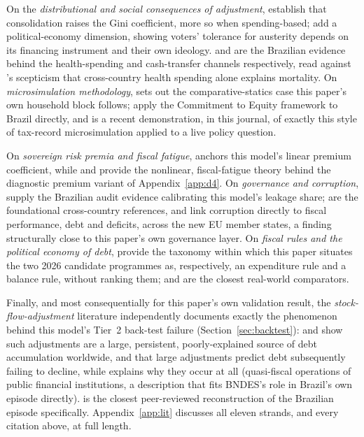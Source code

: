 \documentclass[11pt,a4paper]{article}
\begin{document}
On the \emph{distributional and social consequences of adjustment}, \citet{ballfurcerilleighlloungani2013,woobovakindazhang2017} establish that consolidation raises the Gini coefficient, more so when spending-based; \citet{lagopenasetal2024} add a political-economy dimension, showing voters' tolerance for austerity depends on its financing instrument and their own ideology. \citet{szkloclarkerocha2024} and \citet{rasellaetal2013} are the Brazilian evidence behind the health-spending and cash-transfer channels respectively, read against \citet{filmerpritchett1999}'s scepticism that cross-country health spending alone explains mortality. On \emph{microsimulation methodology}, \citet{bourguignonspadaro2006} sets out the comparative-statics case this paper's own household block follows; \citet{higginspereira2014} apply the Commitment to Equity framework to Brazil directly, and \citet{balladaresgarciamiralles2026} is a recent demonstration, in this journal, of exactly this style of tax-record microsimulation applied to a live policy question.

On \emph{sovereign risk premia and fiscal fatigue}, \citet{baldaccikumar2010} anchors this model's linear premium coefficient, while \citet{ghoshkimmendozaostryqureshi2013} and \citet{bi2012} provide the nonlinear, fiscal-fatigue theory behind the diagnostic premium variant of Appendix~\ref{app:d4}. On \emph{governance and corruption}, \citet{ferrazfinanmoreira2012,avisferrazfinan2018} supply the Brazilian audit evidence calibrating this model's leakage share; \citet{mauro1995,olken2007} are the foundational cross-country references, and \citet{hanousekkocenda2011} link corruption directly to fiscal performance, debt and deficits, across the new EU member states, a finding structurally close to this paper's own governance layer. On \emph{fiscal rules and the political economy of debt}, \citet{kopitssymansky1998} provide the taxonomy within which this paper situates the two 2026 candidate programmes as, respectively, an expenditure rule and a balance rule, without ranking them; \citet{feldkirchgassner2008} and \citet{lopezvillavicencio2025} are the closest real-world comparators.

Finally, and most consequentially for this paper's own validation result, the \emph{stock-flow-adjustment} literature independently documents exactly the phenomenon behind this model's Tier~2 back-test failure (Section~\ref{sec:backtest}): \citet{weber2012sfa} and \citet{jaramilloetal2017} show such adjustments are a large, persistent, poorly-explained source of debt accumulation worldwide, and that large adjustments predict debt subsequently failing to decline, while \citet{mackenziestella1996} explains why they occur at all (quasi-fiscal operations of public financial institutions, a description that fits BNDES's role in Brazil's own episode directly). \citet{gobettiorair2017} is the closest peer-reviewed reconstruction of the Brazilian episode specifically. Appendix~\ref{app:lit} discusses all eleven strands, and every citation above, at full length.
\end{document}
